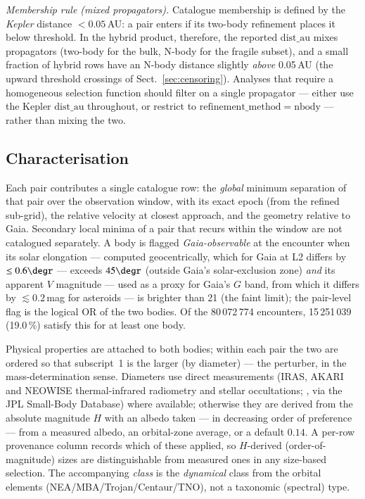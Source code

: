 \documentclass{aa}
\begin{document}
\emph{Membership rule (mixed propagators).} Catalogue membership is defined by
the \emph{Kepler} distance $<0.05$\,AU: a pair enters if its two-body refinement
places it below threshold. In the hybrid product, therefore, the reported
$\mathrm{dist\_au}$ mixes propagators (two-body for the bulk, N-body for the
fragile subset), and a small fraction of hybrid rows have an N-body distance
slightly \emph{above} 0.05\,AU (the upward threshold crossings of
Sect.~\ref{sec:censoring}). Analyses that require a homogeneous selection
function should filter on a single propagator --- either use the Kepler
$\mathrm{dist\_au}$ throughout, or restrict to $\mathrm{refinement\_method} =
\mathrm{nbody}$ --- rather than mixing the two.

\subsection{Characterisation}
\label{sec:characterisation}

Each pair contributes a single catalogue row: the \emph{global} minimum
separation of that pair over the observation window, with its exact epoch (from
the refined sub-grid), the relative velocity at closest approach, and the
geometry relative to Gaia. Secondary local minima of a pair that recurs within
the window are not catalogued separately. A body is flagged
\emph{Gaia-observable} at the encounter when its solar elongation --- computed
geocentrically, which for Gaia at L2 differs by $\le0.6\degr$ --- exceeds
$45\degr$ (outside Gaia's solar-exclusion zone) \emph{and} its apparent $V$
magnitude --- used as a proxy for Gaia's $G$ band, from which it differs by
$\lesssim0.2$\,mag for asteroids --- is brighter than 21 (the faint limit); the
pair-level flag is the
logical OR of the two bodies. Of the 80\,072\,774 encounters, 15\,251\,039
(19.0\,\%) satisfy this for at least one body.

Physical properties are attached to both bodies; within each pair the two are
ordered so that subscript~1 is the larger (by diameter) --- the perturber, in the
mass-determination sense. Diameters use direct
measurements (IRAS, AKARI and NEOWISE thermal-infrared radiometry and stellar
occultations; \citealp{tedesco2002, usui2011, mainzer2011}, via the JPL
Small-Body Database) where available; otherwise they are derived from the
absolute magnitude $H$ with
an albedo taken --- in decreasing order of preference --- from a measured albedo,
an orbital-zone average, or a default $0.14$. A per-row provenance column records
which of these applied, so $H$-derived (order-of-magnitude) sizes are
distinguishable from measured ones in any size-based selection. The
accompanying \emph{class} is the \emph{dynamical} class from the orbital elements
(NEA/MBA/Trojan/Centaur/TNO), not a taxonomic (spectral) type.
\end{document}
